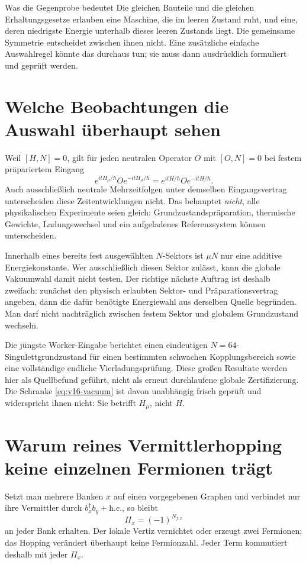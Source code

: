 \begin{bild}{Was die Gegenprobe bedeutet}
Die gleichen Bauteile und die gleichen Erhaltungsgesetze erlauben eine Maschine, die im leeren Zustand ruht, und eine, deren niedrigste Energie unterhalb dieses leeren Zustands liegt. Die gemeinsame Symmetrie entscheidet zwischen ihnen nicht. Eine zusätzliche einfache Auswahlregel könnte das durchaus tun; sie muss dann ausdrücklich formuliert und geprüft werden.
\end{bild}

\section{Welche Beobachtungen die Auswahl überhaupt sehen}
Weil $[H,N]=0$, gilt für jeden neutralen Operator $O$ mit $[O,N]=0$ bei festem präpariertem Eingang
\begin{equation}
e^{itH_\mu/\hbar}Oe^{-itH_\mu/\hbar}
=e^{itH/\hbar}Oe^{-itH/\hbar}.
\end{equation}
Auch ausschließlich neutrale Mehrzeitfolgen unter demselben Eingangsvertrag unterscheiden diese Zeitentwicklungen nicht. Das behauptet \emph{nicht}, alle physikalischen Experimente seien gleich: Grundzustandspräparation, thermische Gewichte, Ladungswechsel und ein aufgeladenes Referenzsystem können unterscheiden.

Innerhalb eines bereits fest ausgewählten $N$-Sektors ist $\mu N$ nur eine additive Energiekonstante. Wer ausschließlich diesen Sektor zulässt, kann die globale Vakuumwahl damit nicht testen. Der richtige nächste Auftrag ist deshalb zweifach: zunächst den physisch erlaubten Sektor- und Präparationsvertrag angeben, dann die dafür benötigte Energiewahl aus derselben Quelle begründen. Man darf nicht nachträglich zwischen festem Sektor und globalem Grundzustand wechseln.

Die jüngste Worker-Eingabe berichtet einen eindeutigen $N=64$-Singulettgrundzustand für einen bestimmten schwachen Kopplungsbereich sowie eine vollständige endliche Vierladungsprüfung. Diese großen Resultate werden hier als Quellbefund geführt, nicht als erneut durchlaufene globale Zertifizierung. Die Schranke \eqref{eq:v16-vacuum} ist davon unabhängig frisch geprüft und widerspricht ihnen nicht: Sie betrifft $H_\mu$, nicht $H$.

\section{Warum reines Vermittlerhopping keine einzelnen Fermionen trägt}
Setzt man mehrere Banken $x$ auf einen vorgegebenen Graphen und verbindet nur ihre Vermittler durch $b_x^\dagger b_y+\mathrm{h.c.}$, so bleibt
\begin{equation}
\Pi_x=(-1)^{N_{f,x}}
\end{equation}
an jeder Bank erhalten. Der lokale Vertiz vernichtet oder erzeugt zwei Fermionen; das Hopping verändert überhaupt keine Fermionzahl. Jeder Term kommutiert deshalb mit jeder $\Pi_x$.

